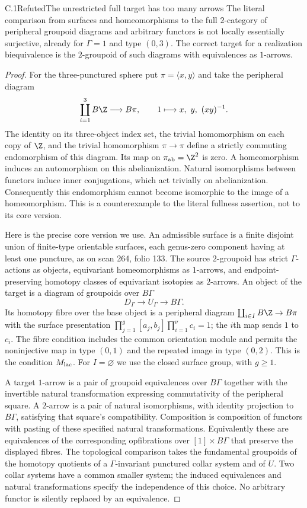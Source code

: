 \begin{claim}{C.1}{Refuted}{The unrestricted full target has too many arrows}
The literal comparison from surfaces and homeomorphisms to the full
$2$-category of peripheral groupoid diagrams and arbitrary functors is
not locally essentially surjective, already for $\Gamma=1$ and type
$(0,3)$. The correct target for a realization biequivalence is the
$2$-groupoid of such diagrams with equivalences as $1$-arrows.
\end{claim}
\begin{proof}
For the three-punctured sphere put $\pi=\langle x,y\rangle$ and take the
peripheral diagram
\[
 \coprod_{i=1}^3 B\Z\longrightarrow B\pi,
 \qquad 1\longmapsto x,\ y,\ (xy)^{-1}.
\]
The identity on its three-object index set, the trivial homomorphism on
each copy of $\Z$, and the trivial homomorphism $\pi\to\pi$ define a
strictly commuting endomorphism of this diagram. Its map on
$\pi_{\rm ab}=\Z^2$ is zero. A homeomorphism induces an automorphism on
this abelianization. Natural isomorphisms between functors induce inner
conjugations, which act trivially on abelianization. Consequently this
endomorphism cannot become isomorphic to the image of a homeomorphism.
This is a counterexample to the literal fullness assertion, not to its
core version.

Here is the precise core version we use. An admissible surface is a
finite disjoint union of finite-type orientable surfaces, each genus-zero
component having at least one puncture, as on scan 264, folio 133. The
source $2$-groupoid has strict $\Gamma$-actions as objects, equivariant
homeomorphisms as $1$-arrows, and endpoint-preserving homotopy classes of
equivariant isotopies as $2$-arrows. An object of the target is a diagram
of groupoids over $B\Gamma$
\[
 D_\Gamma\longrightarrow U_\Gamma\longrightarrow B\Gamma.
\]
Its homotopy fibre over the base object is a peripheral diagram
$\coprod_{i\in I}B\Z\to B\pi$ with the surface presentation
$\prod_{j=1}^{g}[a_j,b_j]\prod_{i=1}^{\nu}c_i=1$; the $i$th map sends
$1$ to $c_i$. The fibre condition includes the common orientation module
and permits the noninjective map in type $(0,1)$ and the repeated image
in type $(0,2)$. This is the condition $M_{\rm lac}$. For $I=\varnothing$
we use the closed surface group, with $g\geq1$.

A target $1$-arrow is a pair of groupoid equivalences over $B\Gamma$
together with the invertible natural transformation expressing
commutativity of the peripheral square. A $2$-arrow is a pair of natural
isomorphisms, with identity projection to $B\Gamma$, satisfying that
square's compatibility. Composition is composition of functors with
pasting of these specified natural transformations. Equivalently these
are equivalences of the corresponding opfibrations over
$[1]\times B\Gamma$ that preserve the displayed fibres. The topological
comparison takes the fundamental groupoids of the homotopy quotients of
a $\Gamma$-invariant punctured collar system and of $U$. Two collar
systems have a common smaller system; the induced equivalences and
natural transformations specify the independence of this choice.
No arbitrary functor is silently replaced by an equivalence.
\end{proof}

